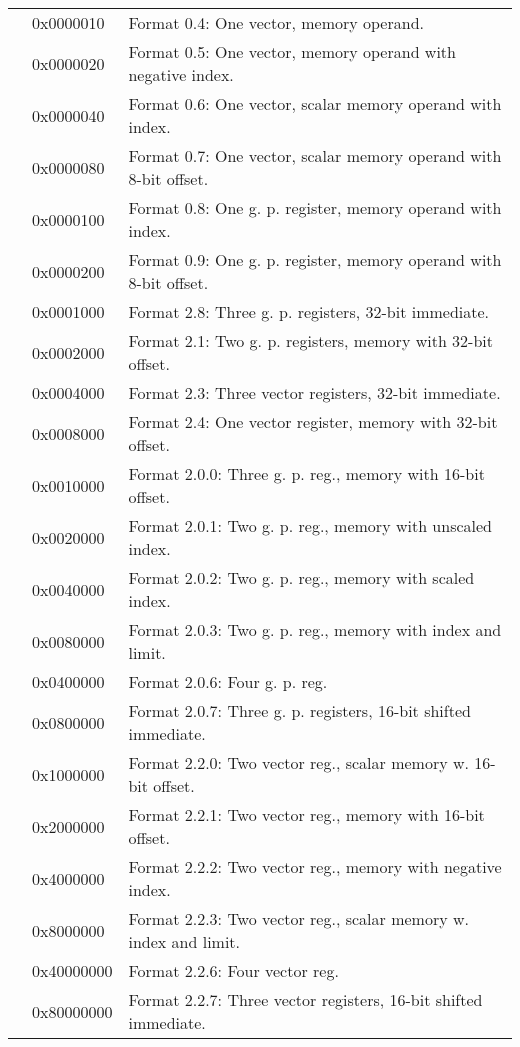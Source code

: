 \documentclass[forwardcom.tex]{subfiles}
\begin{document}
\begin{longtable} {|p{18mm}|p{20mm} p{80mm}|}
  &  0x0000010 & Format 0.4: One vector, memory operand. \\
  &  0x0000020 & Format 0.5: One vector, memory operand with negative index. \\
  &  0x0000040 & Format 0.6: One vector, scalar memory operand with index. \\
  &  0x0000080 & Format 0.7: One vector, scalar memory operand with 8-bit offset. \\
  &  0x0000100 & Format 0.8: One g. p. register, memory operand with index. \\
  &  0x0000200 & Format 0.9: One g. p. register, memory operand with 8-bit offset. \\
  
  &  0x0001000 & Format 2.8: Three g. p. registers, 32-bit immediate. \\
  &  0x0002000 & Format 2.1: Two g. p. registers, memory with 32-bit offset. \\
  &  0x0004000 & Format 2.3: Three vector registers, 32-bit immediate. \\
  &  0x0008000 & Format 2.4: One vector register, memory with 32-bit offset. \\
  
  &  0x0010000 & Format 2.0.0: Three g. p. reg., memory with 16-bit offset. \\
  &  0x0020000 & Format 2.0.1: Two g. p. reg., memory with unscaled index. \\
  &  0x0040000 & Format 2.0.2: Two g. p. reg., memory with scaled index. \\
  &  0x0080000 & Format 2.0.3: Two g. p. reg., memory with index and limit.\\  
  &  0x0400000 & Format 2.0.6: Four g. p. reg.\\
  &  0x0800000 & Format 2.0.7: Three g. p. registers, 16-bit shifted immediate. \\  

  &  0x1000000 & Format 2.2.0: Two vector reg., scalar memory w. 16-bit offset. \\
  &  0x2000000 & Format 2.2.1: Two vector reg., memory with 16-bit offset. \\
  &  0x4000000 & Format 2.2.2: Two vector reg., memory with negative index. \\
  &  0x8000000 & Format 2.2.3: Two vector reg., scalar memory w. index and limit. \\
  & 0x40000000 & Format 2.2.6: Four vector reg. \\
  & 0x80000000 & Format 2.2.7: Three vector registers, 16-bit shifted immediate.\\
  

\end{longtable}
\end{document}
